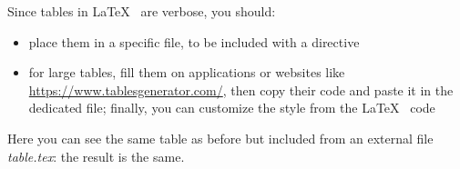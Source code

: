\documentclass[12pt,oneside,a4paper]{article}
\begin{document}
Since tables in \LaTeX~ are verbose, you should:
\begin{itemize}
\item place them in a specific file, to be included with a \verb|| directive
\item for large tables, fill them on applications or websites like \url{https://www.tablesgenerator.com/}, then copy their code and paste it in the dedicated file; finally, you can customize the style from the \LaTeX~ code
\end{itemize}

Here you can see the same table as before but included from an external file \textit{table.tex}: the result is the same.
%


\printbibliography
\end{document}
